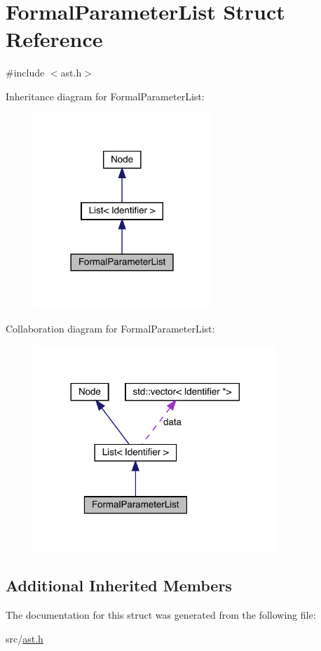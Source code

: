 \hypertarget{struct_formal_parameter_list}{}\section{Formal\+Parameter\+List Struct Reference}
\label{struct_formal_parameter_list}


{\ttfamily \#include $<$ast.\+h$>$}



Inheritance diagram for Formal\+Parameter\+List\+:\nopagebreak
\begin{figure}[H]
\begin{center}
\leavevmode
\includegraphics[width=189pt]{struct_formal_parameter_list__inherit__graph}
\end{center}
\end{figure}


Collaboration diagram for Formal\+Parameter\+List\+:\nopagebreak
\begin{figure}[H]
\begin{center}
\leavevmode
\includegraphics[width=260pt]{struct_formal_parameter_list__coll__graph}
\end{center}
\end{figure}
\subsection*{Additional Inherited Members}


The documentation for this struct was generated from the following file\+:\begin{DoxyCompactItemize}
\item 
src/\hyperlink{ast_8h}{ast.\+h}\end{DoxyCompactItemize}
